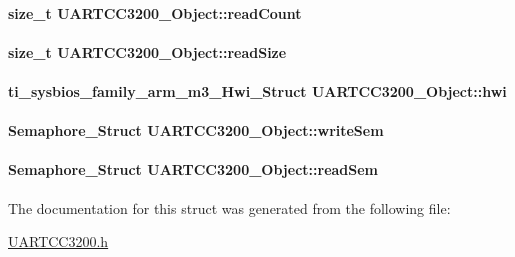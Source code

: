 \paragraph[{read\-Count}]{\setlength{\rightskip}{0pt plus 5cm}size\-\_\-t U\-A\-R\-T\-C\-C3200\-\_\-\-Object\-::read\-Count}\label{struct_u_a_r_t_c_c3200___object_ae522c92db103926250edf8635fbf700d}
\paragraph[{read\-Size}]{\setlength{\rightskip}{0pt plus 5cm}size\-\_\-t U\-A\-R\-T\-C\-C3200\-\_\-\-Object\-::read\-Size}\label{struct_u_a_r_t_c_c3200___object_ad58d2a42f36df0f01092b61f2ddb3ab2}
\paragraph[{hwi}]{\setlength{\rightskip}{0pt plus 5cm}ti\-\_\-sysbios\-\_\-family\-\_\-arm\-\_\-m3\-\_\-\-Hwi\-\_\-\-Struct U\-A\-R\-T\-C\-C3200\-\_\-\-Object\-::hwi}\label{struct_u_a_r_t_c_c3200___object_a3f865a7eab319abf584688efb55ad45a}
\paragraph[{write\-Sem}]{\setlength{\rightskip}{0pt plus 5cm}Semaphore\-\_\-\-Struct U\-A\-R\-T\-C\-C3200\-\_\-\-Object\-::write\-Sem}\label{struct_u_a_r_t_c_c3200___object_a2e92b8d6331233c43fd12c8b5ef9ec65}
\paragraph[{read\-Sem}]{\setlength{\rightskip}{0pt plus 5cm}Semaphore\-\_\-\-Struct U\-A\-R\-T\-C\-C3200\-\_\-\-Object\-::read\-Sem}\label{struct_u_a_r_t_c_c3200___object_ab5bedb5aad0d9022d6dde6a4a6b49889}


The documentation for this struct was generated from the following file\-:\begin{DoxyCompactItemize}
\item 
\hyperlink{_u_a_r_t_c_c3200_8h}{U\-A\-R\-T\-C\-C3200.\-h}\end{DoxyCompactItemize}
